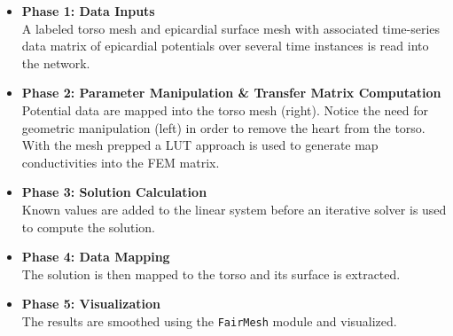 \begin{itemize}
\item {\bf Phase 1: Data Inputs} \\
A labeled torso mesh and epicardial surface mesh with associated time-series data matrix of epicardial potentials over several time instances is read into the network.
\item {\bf Phase 2: Parameter Manipulation \& Transfer Matrix Computation} \\
Potential data are mapped into the torso mesh (right). Notice the need for geometric manipulation (left) in order to remove the heart from the torso. With the mesh prepped a LUT approach is used to generate map conductivities into the FEM matrix.
\item {\bf Phase 3: Solution Calculation} \\
Known values are added to the linear system before an iterative solver is used to compute the solution.
\item {\bf Phase 4: Data Mapping} \\
The solution is then mapped to the torso and its surface is extracted.
\item {\bf Phase 5: Visualization} \\
The results are smoothed using the {\tt FairMesh} module and visualized.
\end{itemize}

